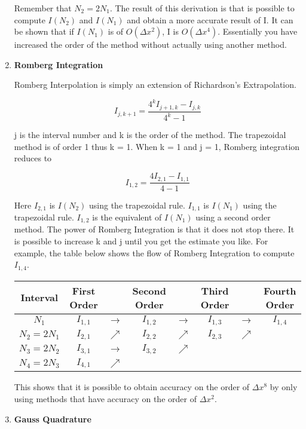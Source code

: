 \begin{enumerate}
  Remember that $N_2 = 2N_1$. The result of this derivation is that is
  possible to compute $I(N_2)$ and $I(N_1)$ and obtain a more
  accurate result of I. It can be shown that if $I(N_1)$ is of
  $O(\Delta x^2)$, I is $O(\Delta x^4)$. Essentially you have
  increased the order of the method without actually using another
  method.

  \item {\bf Romberg Integration}

    Romberg Interpolation is simply an extension of Richardson's
    Extrapolation. 

    \begin{equation}
      I_{j,k+1} = \frac{4^k I_{j+1,k} - I_{j,k}}{4^k - 1}
    \end{equation}

    j is the interval number and k is the order of the method. The
    trapezoidal method is of order 1 thus k = 1. When k = 1 and j = 1, Romberg
    integration reduces to 

    \begin{equation}
      I_{1,2} = \frac{4 I_{2,1} - I_{1,1}}{4 - 1}
    \end{equation}

    Here $I_{2,1}$ is $I(N_2)$ using the trapezoidal rule. $I_{1,1}$
    is $I(N_1)$ using the trapezoidal rule. $I_{1,2}$ is the
    equivalent of $I(N_1)$ using a second order method. The power of
    Romberg Integration is that it does not stop there. It is possible
    to increase k and j until you get the estimate you like. For
    example, the table below shows the flow of Romberg Integration to
    compute $I_{1,4}$.

    \begin{center}
      \begin{tabular}{c | c c c c c c c}
        Interval & First Order & & Second Order & & Third Order & & Fourth
        Order \\
        \hline
        $N_1$ & $I_{1,1}$ & $\longrightarrow$ & $I_{1,2}$ & $\longrightarrow$ &
        $I_{1,3}$ & $\longrightarrow$ & $I_{1,4}$ \\
        $N_2=2N_1$ & $I_{2,1}$ & $\nearrow$ & $I_{2,2}$ & $\nearrow$ &
        $I_{2,3}$ &  $\nearrow$ \\
        $N_3=2N_2$ & $I_{3,1}$ & $\longrightarrow$ & $I_{3,2}$ & $\nearrow$ &
        &  \\
        $N_4=2N_3$ & $I_{4,1}$ & $\nearrow$ & & &     &  \\
      \end{tabular}
    \end{center}

    This shows that it is possible to obtain accuracy on the order of
    $\Delta x^8$ by only using methods that have accuracy on the order
    of $\Delta x^2$.

\item {\bf Gauss Quadrature}

\end{enumerate}
